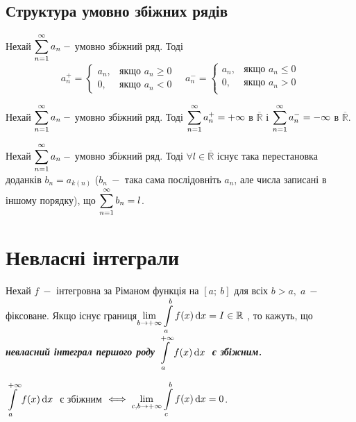 \subsection{\large{Структура умовно збіжних рядів}}
Нехай $\displaystyle\sum\limits_{n=1}^\infty a_n \: -$ умовно збіжний ряд. Тоді 
\begin{equation*}
a^+_n =  \begin{cases}
            a_n, & \text{якщо $a_n \geqslant 0 $} \\
            0, & \text{якщо $a_n < 0$} 
       \end{cases} \quad
a^-_n =  \begin{cases}
               a_n, & \text{якщо $a_n \leqslant  0 $} \\
            0, & \text{якщо $a_n > 0$} \\
      
       \end{cases}
\end{equation*}


\begin{theorem}
Нехай $\displaystyle\sum\limits_{n=1}^\infty a_n \: - $ умовно збіжний ряд. Тоді  $\displaystyle\sum\limits_{n=1}^\infty a_n^{+} = +\infty$ в $\mathbb{\overline{R}}$ і 
  $\displaystyle\sum\limits_{n=1}^\infty a_n ^{-}= -\infty$ в $\mathbb{\overline{R}}$.
\end{theorem}


\begin{theorem} 

Нехай $\displaystyle\sum\limits_{n=1}^\infty a_n \: -$ умовно збіжний ряд. Тоді  $\forall l \in 
\mathbb{\overline{R}}$ існує така перестановка доданків  $b_n = a_{k(n)}$ 
($b_n \: -$ така сама послідовніть $a_n$, але числа записані в іншому порядку), що  $\displaystyle\sum\limits_{n=1}^\infty b_n = l$.
\end{theorem}


\section{\Large{Невласні інтеграли}}

\begin{definition}
    Нехай $f \: -$ інтегровна за Ріманом функція на $[a; \:b]$ для всіх $ b>a,\; a \: -$ фіксоване. Якщо існує границя$ \displaystyle\lim\limits_{b \to +\infty} \displaystyle\int\limits_a^b f(x) \, \mathrm{d}x=I \in \mathbb{R}$ , то кажуть, що  \textcolor{NavyBlue}{\textbf{\textit{невласний інтеграл першого роду}}} $\Int_a^{+\infty} f(x) \, \mathrm{d}x \ $  \textcolor{NavyBlue}{\textbf{\textit{є збіжним. }}}
\end{definition}
\begin{theorem} 
$\Int_a^{+\infty} f(x) \, \mathrm{d}x \ $ є збіжним $\iff \displaystyle\lim\limits_{c, b \to +\infty} \displaystyle\int\limits_c^b f(x) \, \mathrm{d}x = 0$.
\end{theorem}


